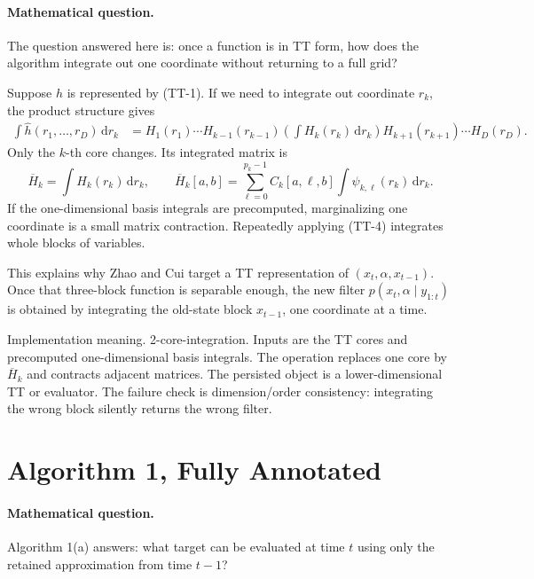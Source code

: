 \documentclass[11pt]{article}
\numberwithin{equation}{section}
\newcommand{\dd}{\,\mathrm d}
\begin{document}
\paragraph{Mathematical question.}
The question answered here is: once a function is in TT form, how does the
algorithm integrate out one coordinate without returning to a full grid?

Suppose \(h\) is represented by (TT-1).  If we need to integrate out coordinate
\(r_k\), the product structure gives
\begin{equation}
\begin{aligned}
 \int \widehat h(r_1,\ldots,r_D)\dd r_k
 &=
 H_1(r_1)\cdots H_{k-1}(r_{k-1})
 \left(\int H_k(r_k)\dd r_k\right)
 H_{k+1}(r_{k+1})\cdots H_D(r_D).
\end{aligned}
\label{eq:p24-tt-4}
\end{equation}
Only the \(k\)-th core changes.  Its integrated matrix is
\begin{equation}
    \overline H_k
    =
    \int H_k(r_k)\dd r_k,\qquad
    \overline H_k[a,b]
    =
    \sum_{\ell=0}^{p_k-1} C_k[a,\ell,b]
    \int \psi_{k,\ell}(r_k)\dd r_k.
    \label{eq:p24-tt-5}
\end{equation}
If the one-dimensional basis integrals are precomputed, marginalizing one
coordinate is a small matrix contraction.  Repeatedly applying (TT-4) integrates
whole blocks of variables.

This explains why Zhao and Cui \cite{zhao2024ttsequential} target a TT representation of
\((x_t,\alpha,x_{t-1})\).  Once that three-block function is separable enough,
the new filter \(p(x_t,\alpha\mid y_{1:t})\) is obtained by integrating the
old-state block \(x_{t-1}\), one coordinate at a time.

Implementation meaning. 2-core-integration.  Inputs are the TT cores and
precomputed one-dimensional basis integrals.  The operation replaces one core
by \(\overline H_k\) and contracts adjacent matrices.  The persisted object is a
lower-dimensional TT or evaluator.  The failure check is dimension/order
consistency: integrating the wrong block silently returns the wrong filter.

\section{Algorithm 1, Fully Annotated}

\paragraph{Mathematical question.}
Algorithm 1(a) answers: what target can be evaluated at time \(t\) using only
the retained approximation from time \(t-1\)?
\end{document}
